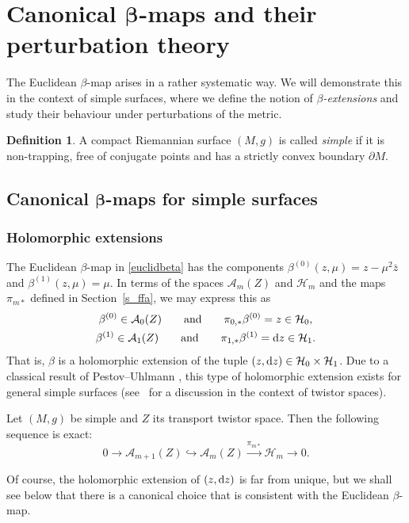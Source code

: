 \documentclass[pdftex]{sigma}
\numberwithin{equation}{section}
\theoremstyle{definition}
\newtheorem{Definition}[Theorem]{Definition}
\newcommand{\1}{{\bf 1}}
\begin{document}
\section[Canonical beta-maps and their perturbation theory]{Canonical $\boldsymbol{\beta}$-maps and their perturbation theory}\label{s_betamaps}

The Euclidean $\beta$-map arises in a rather systematic way. We will demonstrate this in the context of simple surfaces, where we define the notion of {\it $\beta$-extensions} and study their behaviour under perturbations of the metric.

\begin{Definition} \label{def_simple}A compact Riemannian surface $(M,g)$ is called {\it simple} if it is non-trapping, free of conjugate points and has a strictly convex boundary $\partial M$.
\end{Definition}



\subsection[Canonical beta-maps for simple surfaces]{Canonical $\boldsymbol{\beta}$-maps for simple surfaces}\label{s_canonicalbeta}


\subsubsection{Holomorphic extensions}\label{s_holext}
The Euclidean $\beta$-map in \eqref{euclidbeta} has the components $\beta^{(0)}(z,\mu)=z-\mu^2 \bar z$ and $\beta^{(1)}(z,\mu)=\mu$. In terms of the spaces $\mathcal A_m(Z)$ and $\mathcal H_m$ and the maps $\pi_{m*}$ defined in Section~\ref{s_ffa}, we may express this as
\begin{gather*}
	\beta^{(0)} \in \mathcal A_0(Z)\qquad \text{and} \qquad \pi_{0,*}\beta^{(0)} = z \in \mathcal H_0,\\
	\beta^{(1)} \in \mathcal A_1(Z)\qquad \text{and} \qquad \pi_{1,*}\beta^{(1)} = {\rm d}z \in \mathcal H_1.
\end{gather*}
That is, $\beta$ is a holomorphic extension of the tuple $(z,{\rm d}z)\in \mathcal H_0\times \mathcal H_1$. Due to a classical result of Pestov--Uhlmann \cite{PeUh05}, this type of holomorphic extension exists for general simple surfaces (see~\cite{BLP24,BoPa23} for a discussion in the context of twistor spaces).

\begin{theorem*}
Let $(M,g)$ be simple and $Z$ its transport twistor space. Then the following sequence is exact:
\[
	0\rightarrow \mathcal A_{m+1}(Z)\hookrightarrow \mathcal A_m(Z) \xrightarrow{\pi_{m*}} \mathcal H_m\rightarrow 0.
\]	
\end{theorem*}
Of course, the holomorphic extension of $(z,{\rm d}z)$ is far from unique, but we shall see below that there is a canonical choice that is consistent with the Euclidean $\beta$-map.
\end{document}
